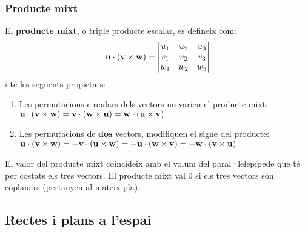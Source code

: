 \documentclass{beamer}
\begin{document}
\begin{frame}
  \frametitle{Producte mixt}
  El {\bf producte mixt}, o triple producte escalar, es defineix com:
  \[
    \textbf{u}\cdot (\textbf{v}\times\textbf{w})=
    \begin{vmatrix}
    u_1 & u_2 & u_3 \\
    v_1 & v_2 & v_3 \\
    w_1 & w_2 & w_3
    \end{vmatrix}
  \]
  i té les següents propietats:
  \begin{enumerate}
    \item Les permutacions circulars dels vectors no varien el producte mixt: $\textbf{u}\cdot (\textbf{v}\times\textbf{w})=\textbf{v}\cdot (\textbf{w}\times\textbf{u})=\textbf{w}\cdot (\textbf{u}\times\textbf{v})$
    \item Les permutacions de {\bf dos} vectors, modifiquen el signe del producte:
    $\textbf{u}\cdot (\textbf{v}\times\textbf{w})=
    -\textbf{v}\cdot (\textbf{u}\times\textbf{w})=
    -\textbf{u}\cdot (\textbf{w}\times\textbf{v})=
    -\textbf{w}\cdot (\textbf{v}\times\textbf{u})$
  \end{enumerate}

  El valor del producte mixt coincideix amb el volum del paral·lelepípede que té per costats els tres vectors. El producte mixt val 0 si els tres vectors són coplanars (pertanyen al mateix pla).
\end{frame}
\subsection{Rectes i plans a l'espai}
\end{document}

